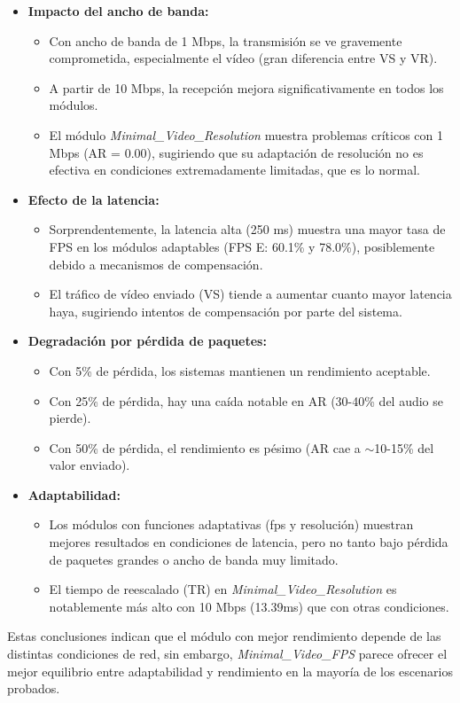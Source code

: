\begin{itemize}
    \item \textbf{Impacto del ancho de banda:}
    \begin{itemize}
        \item Con ancho de banda de 1 Mbps, la transmisión se ve gravemente comprometida, especialmente el vídeo (gran diferencia entre VS y VR).
        \item A partir de 10 Mbps, la recepción mejora significativamente en todos los módulos.
        \item El módulo \textit{Minimal\_Video\_Resolution} muestra problemas críticos con 1 Mbps (AR = 0.00), sugiriendo que su adaptación de resolución no es efectiva en condiciones extremadamente limitadas, que es lo normal.
    \end{itemize}

    \item \textbf{Efecto de la latencia:}
    \begin{itemize}
        \item Sorprendentemente, la latencia alta (250 ms) muestra una mayor tasa de FPS en los módulos adaptables (FPS E: 60.1\% y 78.0\%), posiblemente debido a mecanismos de compensación.
        \item El tráfico de vídeo enviado (VS) tiende a aumentar cuanto mayor latencia haya, sugiriendo intentos de compensación por parte del sistema.
    \end{itemize}

    \item \textbf{Degradación por pérdida de paquetes:}
    \begin{itemize}
        \item Con 5\% de pérdida, los sistemas mantienen un rendimiento aceptable.
        \item Con 25\% de pérdida, hay una caída notable en AR (30-40\% del audio se pierde).
        \item Con 50\% de pérdida, el rendimiento es pésimo (AR cae a $\sim$10-15\% del valor enviado).
    \end{itemize}

    \item \textbf{Adaptabilidad:}
    \begin{itemize}
        \item Los módulos con funciones adaptativas (fps y resolución) muestran mejores resultados en condiciones de latencia, pero no tanto bajo pérdida de paquetes grandes o ancho de banda muy limitado.
        \item El tiempo de reescalado (TR) en \textit{Minimal\_Video\_Resolution} es notablemente más alto con 10 Mbps (13.39ms) que con otras condiciones.
    \end{itemize}
\end{itemize}

Estas conclusiones indican que el módulo con mejor rendimiento depende de las distintas condiciones de red, sin embargo, \textit{Minimal\_Video\_FPS} parece ofrecer el mejor equilibrio entre adaptabilidad y rendimiento en la mayoría de los escenarios probados.




